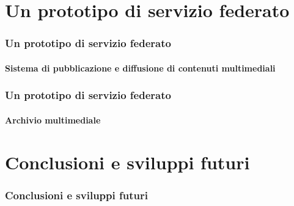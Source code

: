 \documentclass{beamer}
\begin{document}
\section{Un prototipo di servizio federato}

\begin{frame}
  \frametitle{Un prototipo di servizio federato}
  \framesubtitle{Sistema di pubblicazione e diffusione di contenuti multimediali}

\end{frame}

\begin{frame}
  \frametitle{Un prototipo di servizio federato}
  \framesubtitle{Archivio multimediale}

\end{frame}

\section{Conclusioni e sviluppi futuri}

\begin{frame}[fragile]
 \frametitle{Conclusioni e sviluppi futuri}

\end{frame}
\end{document}
